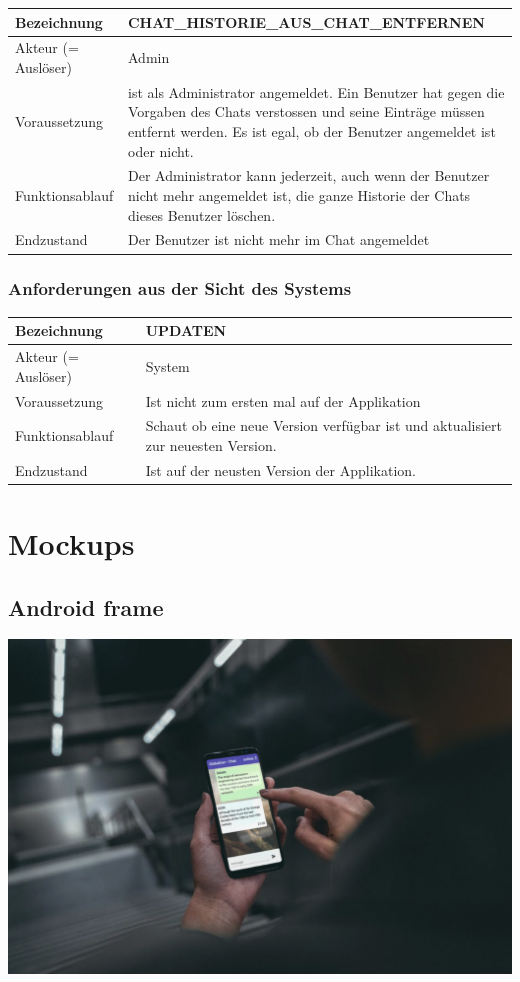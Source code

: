 \documentclass[12pt]{article}
\newcommand{\requirementTable}[5]{
    \begin{table}[H]
      \begin{tabularx}{\textwidth}{|l|X|}
        \hline
        Bezeichnung & #1  \\ \hline
        Akteur (= Auslöser) & #2  \\ \hline
        Voraussetzung & #3  \\ \hline
        Funktionsablauf & #4  \\ \hline
        Endzustand & #5  \\ \hline
      \end{tabularx}
    \end{table}
}
\begin{document}
                           
        \requirementTable
            {CHAT\_HISTORIE\_AUS\_CHAT\_ENTFERNEN}
            {Admin}
            {
            ist als Administrator angemeldet. \newline
            Ein  Benutzer hat gegen die Vorgaben des Chats verstossen und seine Einträge müssen entfernt werden. Es ist egal, ob der Benutzer angemeldet ist oder nicht.
            }
            {
            Der Administrator kann jederzeit, auch wenn der Benutzer nicht mehr angemeldet ist, die ganze Historie der Chats dieses Benutzer löschen.
            }
            {
            Der Benutzer ist nicht mehr im Chat angemeldet
            }
            
      \subsubsection{Anforderungen aus der Sicht des Systems}
         \requirementTable
            {UPDATEN}
            {System}
            {Ist nicht zum ersten mal auf der Applikation}
            {Schaut ob eine neue Version verfügbar ist und aktualisiert zur neuesten Version.}
            {Ist auf der neusten Version der Applikation.}
            
    \section{Mockups}
        \subsection{Android frame}
        \includegraphics[width=\textwidth]{mock-chat.png}
\end{document}
